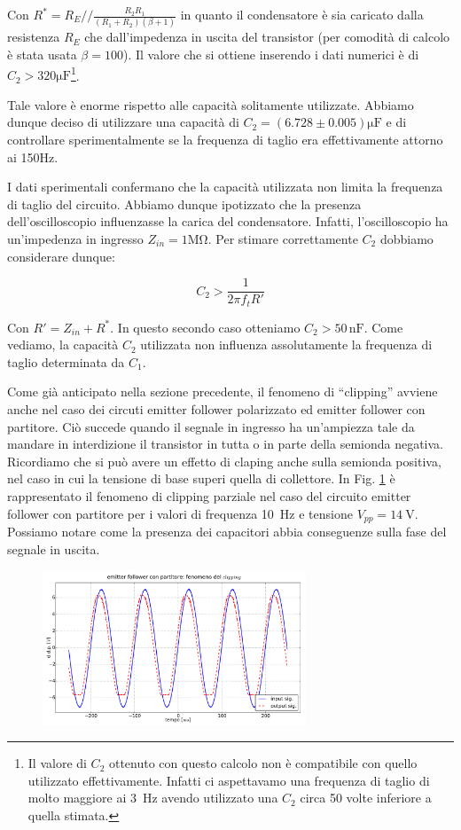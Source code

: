 Con $R^*=R_E//\frac{R_2R_1}{(R_1+R_2)(\beta +1)}$ in quanto il condensatore è sia caricato dalla resistenza $R_E$ che dall'impedenza in uscita del transistor (per comodità di calcolo è stata usata $\beta=100$). Il valore che si ottiene inserendo i dati numerici è di $C_2>320\si{\micro\farad}$\footnote{Il valore di $C_2$ ottenuto con questo calcolo non è compatibile con quello utilizzato effettivamente. Infatti ci aspettavamo una frequenza di taglio di molto maggiore ai \SI{3}{\hertz} avendo utilizzato una $C_2$ circa 50 volte inferiore a quella stimata.}.

Tale valore è enorme rispetto alle capacità solitamente utilizzate. Abbiamo dunque deciso di utilizzare una capacità di $C_2=(6.728 \pm 0.005)\si{\micro\farad}$ e di controllare sperimentalmente se la frequenza di taglio era effettivamente attorno ai 150\si{\hertz}.

I dati sperimentali confermano che la capacità utilizzata non limita la frequenza di taglio del circuito. Abbiamo dunque ipotizzato che la presenza dell'oscilloscopio influenzasse la carica del condensatore. Infatti, l'oscilloscopio ha un'impedenza in ingresso $Z_{in}=1\si{\mega\ohm}$. Per stimare correttamente $C_2$ dobbiamo considerare dunque: 

$$C_2>\frac{1}{2\pi f_t R'}$$

Con $R'=Z_{in}+R^*$. In questo secondo caso otteniamo $C_2>50\,\si{\nano\farad}$.
Come vediamo, la capacità $C_2$ utilizzata non influenza assolutamente la frequenza di taglio determinata da $C_1$. 


Come già anticipato nella sezione precedente, il fenomeno di ``clipping'' avviene anche nel caso dei circuti emitter follower polarizzato ed emitter follower con partitore.
Ciò succede quando il segnale in ingresso ha un'ampiezza tale da mandare in interdizione il transistor in tutta o in parte  della semionda negativa. Ricordiamo che si può avere un effetto di claping anche sulla semionda positiva, nel caso in cui la tensione di base superi quella di collettore. 
In Fig. \ref{fig:clip} è rappresentato il fenomeno di clipping parziale nel caso del circuito emitter follower con partitore per i valori di frequenza \SI{10}{\hertz} e tensione $V_{pp} = \SI{14}{\volt}$. Possiamo notare come la presenza dei capacitori abbia conseguenze sulla fase del segnale in uscita.


\begin{figure}[h]
\centering
	\includegraphics[width=0.7\textwidth]{clip.pdf}
	\caption{}
	\label{fig:clip}
\end{figure}